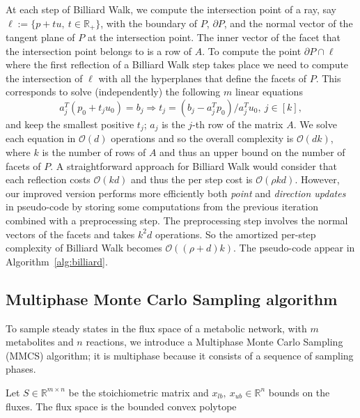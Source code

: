    At each step of Billiard Walk, we compute the intersection point of a ray, say
   $\ell:=\{p+tu,\ t\in\mathbb{R}_+ \}$,
   with the boundary of $P$, $\partial P$, and the normal vector of the tangent
   plane of $P$ at the intersection point.
   The inner vector of the facet that the intersection  point belongs to is a row of $A$.
   To compute the point $\partial P\cap\ell$ where the first reflection of a Billiard Walk
   step takes place we need to compute the intersection of $\ell$ with all the hyperplanes that define the facets of $P$.
   This corresponds to solve (independently) the following $m$ linear equations
   \begin{equation}
     a_j^T(p_0 + t_ju_0) = b_j \Rightarrow t_j = (b_j - a_j^Tp_0) / a_j^Tu_0,\ j \in[k],
   \end{equation}
   and keep the smallest positive $t_j$; $a_j$ is the $j$-th row of the matrix $A$.
   We solve each equation in $\mathcal{O}(d)$ operations and so the overall complexity is
   $\mathcal{O}(d k)$, where $k$ is the number of rows of $A$ and thus an upper bound on
   the number of facets of $P$. A straightforward approach for Billiard Walk would
   consider that each reflection costs $\mathcal{O}(k d)$ and thus the per step cost is
   $\mathcal{O}(\rho kd)$. However, our improved version performs more efficiently both
   \textit{point} and \textit{direction updates} in pseudo-code by storing some
   computations from the previous iteration combined with a preprocessing step. The
   preprocessing step involves the normal vectors of the facets and takes $k^2 d$
   operations. So the amortized per-step complexity of Billiard Walk becomes
   $\mathcal{O}((\rho + d)k)$. The pseudo-code appear in Algorithm~\ref{alg:billiard}.
   
   
   

\subsection{Multiphase Monte Carlo Sampling algorithm}
\label{subsec:mmcs-methods-algor}


   To sample steady states in the flux space of a metabolic network, with $m$
   metabolites and $n$ reactions, we introduce a Multiphase Monte Carlo Sampling
   (MMCS) algorithm; it is multiphase because it consists of a sequence of sampling
   phases.

   Let $S\in\mathbb{R}^{m\times n}$ be the  stoichiometric matrix
   and  $x_{lb},\ x_{ub}\in\mathbb{R}^{n}$
   bounds on the fluxes.
   The flux space is the bounded convex polytope

